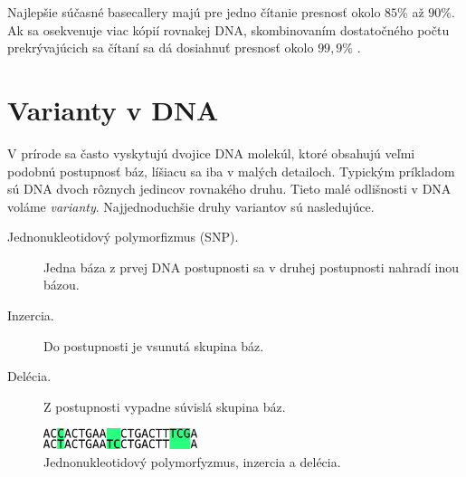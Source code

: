 Najlepšie súčasné basecallery majú pre jedno čítanie presnosť okolo $85\%$ až $90\%$. Ak sa osekvenuje viac kópií rovnakej DNA, skombinovaním dostatočného počtu prekrývajúcich sa čítaní sa dá dosiahnuť presnosť okolo $99,9\%$ \cite{BasecallerComparison}.

\section{Varianty v DNA}

V prírode sa často vyskytujú dvojice DNA molekúl, ktoré obsahujú veľmi podobnú postupnosť báz, líšiacu sa iba v malých detailoch. Typickým príkladom sú DNA dvoch rôznych jedincov rovnakého druhu. Tieto malé odlišnosti v DNA voláme \emph{varianty}. Najjednoduchšie druhy variantov sú nasledujúce.

\begin{description}
\item [Jednonukleotidový polymorfizmus (SNP\footnotemark).] Jedna báza z prvej DNA postupnosti sa v druhej postupnosti nahradí inou bázou.

\item [Inzercia.] Do postupnosti je vsunutá skupina báz.

\item [Delécia.] Z postupnosti vypadne súvislá skupina báz.

\end{description}

\begin{figure}
\centerline{\includegraphics[width=0.4\textwidth]{images/varianty}}
\caption[Varianty v DNA.]{Jednonukleotidový polymorfyzmus, inzercia a delécia.}
\label{obr:varianty}
\end{figure}